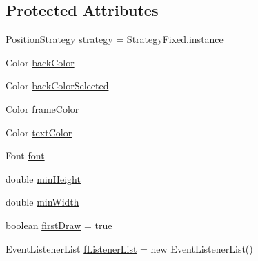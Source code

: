 \subsection*{Protected Attributes}
\begin{DoxyCompactItemize}
\item 
\hyperlink{interfaceorg_1_1tzi_1_1use_1_1gui_1_1views_1_1diagrams_1_1elements_1_1positioning_1_1_position_strategy}{Position\-Strategy} \hyperlink{classorg_1_1tzi_1_1use_1_1gui_1_1views_1_1diagrams_1_1elements_1_1_placeable_node_af7e97f25b5b99dd5519dccf359892b26}{strategy} = \hyperlink{classorg_1_1tzi_1_1use_1_1gui_1_1views_1_1diagrams_1_1elements_1_1positioning_1_1_strategy_fixed_a973a1566cc43e33e560f48fab1a9cf42}{Strategy\-Fixed.\-instance}
\item 
Color \hyperlink{classorg_1_1tzi_1_1use_1_1gui_1_1views_1_1diagrams_1_1elements_1_1_placeable_node_a1ce71c0d603d445c6ceb7de11b070f21}{back\-Color}
\item 
Color \hyperlink{classorg_1_1tzi_1_1use_1_1gui_1_1views_1_1diagrams_1_1elements_1_1_placeable_node_adc74a41bc4ce7dd19ad0fb6f1fb0407e}{back\-Color\-Selected}
\item 
Color \hyperlink{classorg_1_1tzi_1_1use_1_1gui_1_1views_1_1diagrams_1_1elements_1_1_placeable_node_acf1652e351e65486fc5e265fd0e1063f}{frame\-Color}
\item 
Color \hyperlink{classorg_1_1tzi_1_1use_1_1gui_1_1views_1_1diagrams_1_1elements_1_1_placeable_node_a875879f3e5c9d237f86c82f253f8173c}{text\-Color}
\item 
Font \hyperlink{classorg_1_1tzi_1_1use_1_1gui_1_1views_1_1diagrams_1_1elements_1_1_placeable_node_af4388194b24b4b30c30c5159498a4625}{font}
\item 
double \hyperlink{classorg_1_1tzi_1_1use_1_1gui_1_1views_1_1diagrams_1_1elements_1_1_placeable_node_abc6784edb9c4b5ff121085d966b15dc5}{min\-Height}
\item 
double \hyperlink{classorg_1_1tzi_1_1use_1_1gui_1_1views_1_1diagrams_1_1elements_1_1_placeable_node_ab1784ddd1aedb47ed56dab7205a644e2}{min\-Width}
\item 
boolean \hyperlink{classorg_1_1tzi_1_1use_1_1gui_1_1views_1_1diagrams_1_1elements_1_1_placeable_node_a2849ff2aeb615434d82c9112a11c2bac}{first\-Draw} = true
\item 
Event\-Listener\-List \hyperlink{classorg_1_1tzi_1_1use_1_1gui_1_1views_1_1diagrams_1_1elements_1_1_placeable_node_a5bed45ff06fa7f6babf3260525d694c7}{f\-Listener\-List} = new Event\-Listener\-List()
\end{DoxyCompactItemize}


